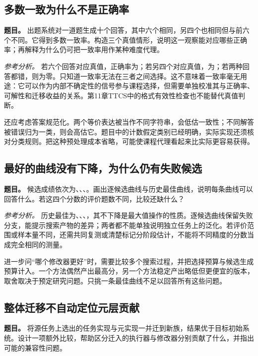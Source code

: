 \subsection{多数一致为什么不是正确率}

\textbf{题目。} 出题系统对一道题生成十个回答，其中六个相同，另四个也相同但与前六个不同。它得到多数一致率。构造三个真值情形，说明这一观察能对应哪些正确率；再解释为什么仍可把一致率用作某种难度代理。

\emph{参考分析。} 若六个回答对应真值，正确率为；若另四个对应真值，为；若两种回答都错，则为零。只知道一致率无法在三者之间选择。这不意味着一致率毫无用途：它可以作为内部不确定性的信号参与课程选择，但需要单独校准其与正确率、可解性和迁移收益的关系。第11章TTCS中的格式有效性检查也不能替代真值判断。

还应考虑答案规范化。两个等价表达被当作不同字符串，会低估一致性；不同解答被错误归为一类，则会高估它。题目中的计数假定类别已经明确，实际实现还须核对分类规则。把这种预处理成本省略，可能使课程代理看起来比实际更容易获得。

\subsection{最好的曲线没有下降，为什么仍有失败候选}

\textbf{题目。} 候选成绩依次为、、、。画出逐候选曲线与历史最佳曲线，说明每条曲线可以回答什么。若这四个分数的评价题数不同，比较还缺什么？

\emph{参考分析。} 历史最佳为、、、，其不下降是最大值操作的性质。逐候选曲线保留失败分支，能提示搜索产物的差异；两者都不能单独说明独立任务上的泛化。若评价范围或样本量不同，还需共同复测或清楚标记分阶段估计，不能将不同精度的分数当成完全相同的测量。

进一步问“哪个修改器更好”时，需要比较多个搜索过程，并把选择预算与候选生成预算计入。一个方法偶然产出最高分，另一个方法稳定产出略低但更便宜的版本，取舍取决于预定研究问题。只挑一条最佳曲线不足以回答所有这些问题。

\subsection{整体迁移不自动定位元层贡献}

\textbf{题目。} 将源任务上选出的任务实现与元实现一并迁到新族，结果优于目标初始系统。设计一项额外比较，帮助区分迁入的执行器与修改器分别贡献了什么，并指出可能的兼容性问题。

